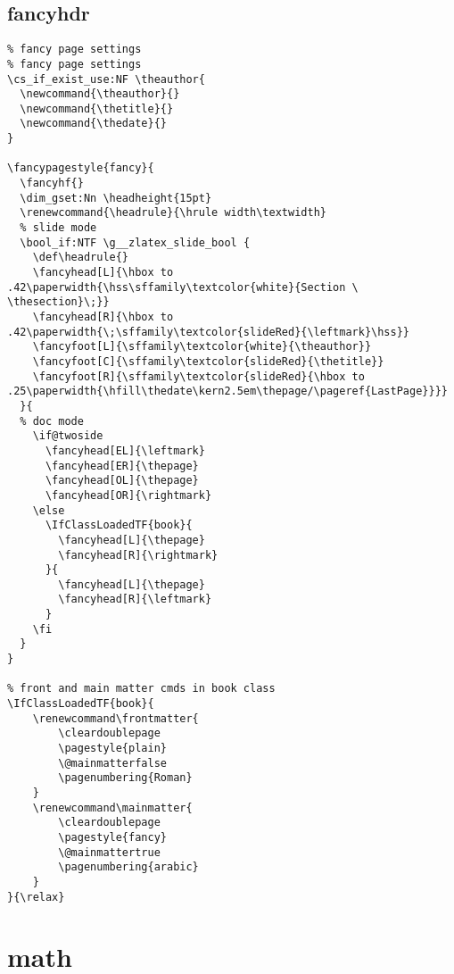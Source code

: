 \subsection{fancyhdr}
\begin{verbatim}
% fancy page settings
% fancy page settings
\cs_if_exist_use:NF \theauthor{
  \newcommand{\theauthor}{}
  \newcommand{\thetitle}{}
  \newcommand{\thedate}{}
}

\fancypagestyle{fancy}{
  \fancyhf{}  
  \dim_gset:Nn \headheight{15pt}
  \renewcommand{\headrule}{\hrule width\textwidth}
  % slide mode
  \bool_if:NTF \g__zlatex_slide_bool {
    \def\headrule{}
    \fancyhead[L]{\hbox to .42\paperwidth{\hss\sffamily\textcolor{white}{Section \ \thesection}\;}}
    \fancyhead[R]{\hbox to .42\paperwidth{\;\sffamily\textcolor{slideRed}{\leftmark}\hss}}
    \fancyfoot[L]{\sffamily\textcolor{white}{\theauthor}}
    \fancyfoot[C]{\sffamily\textcolor{slideRed}{\thetitle}}
    \fancyfoot[R]{\sffamily\textcolor{slideRed}{\hbox to .25\paperwidth{\hfill\thedate\kern2.5em\thepage/\pageref{LastPage}}}}
  }{
  % doc mode
    \if@twoside
      \fancyhead[EL]{\leftmark}
      \fancyhead[ER]{\thepage}
      \fancyhead[OL]{\thepage}
      \fancyhead[OR]{\rightmark}
    \else
      \IfClassLoadedTF{book}{
        \fancyhead[L]{\thepage}
        \fancyhead[R]{\rightmark}
      }{
        \fancyhead[L]{\thepage}
        \fancyhead[R]{\leftmark}
      }
    \fi
  }
}

% front and main matter cmds in book class
\IfClassLoadedTF{book}{
    \renewcommand\frontmatter{
        \cleardoublepage
        \pagestyle{plain}
        \@mainmatterfalse
        \pagenumbering{Roman}
    }
    \renewcommand\mainmatter{
        \cleardoublepage
        \pagestyle{fancy}
        \@mainmattertrue
        \pagenumbering{arabic}
    }
}{\relax}
\end{verbatim}


\section{math}
